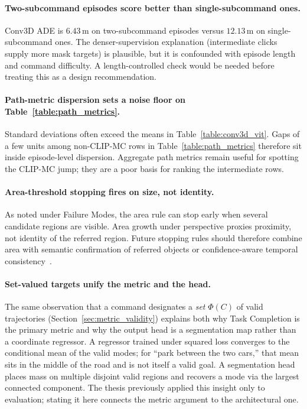 \paragraph{Two-subcommand episodes score better than single-subcommand ones.}
Conv3D ADE is $6.43\,\mathrm{m}$ on two-subcommand episodes versus $12.13\,\mathrm{m}$ on single-subcommand ones. The denser-supervision explanation (intermediate clicks supply more mask targets) is plausible, but it is confounded with episode length and command difficulty. A length-controlled check would be needed before treating this as a design recommendation.

\paragraph{Path-metric dispersion sets a noise floor on Table~\ref{table:path_metrics}.}
Standard deviations often exceed the means in Table~\ref{table:conv3d_vit}. Gaps of a few units among non-CLIP-MC rows in Table~\ref{table:path_metrics} therefore sit inside episode-level dispersion. Aggregate path metrics remain useful for spotting the CLIP-MC jump; they are a poor basis for ranking the intermediate rows.

\paragraph{Area-threshold stopping fires on size, not identity.}
As noted under Failure Modes, the area rule can stop early when several candidate regions are visible. Area growth under perspective proxies proximity, not identity of the referred region. Future stopping rules should therefore combine area with semantic confirmation of referred objects or confidence-aware temporal consistency~\cite{xiang-etal-2020-learning}.

\paragraph{Set-valued targets unify the metric and the head.}
The same observation that a command designates a \emph{set} $\Phi(C)$ of valid trajectories (Section~\ref{sec:metric_validity}) explains both why Task Completion is the primary metric and why the output head is a segmentation map rather than a coordinate regressor. A regressor trained under squared loss converges to the conditional mean of the valid modes; for ``park between the two cars,'' that mean sits in the middle of the road and is not itself a valid goal. A segmentation head places mass on multiple disjoint valid regions and recovers a mode via the largest connected component. The thesis previously applied this insight only to evaluation; stating it here connects the metric argument to the architectural one.

